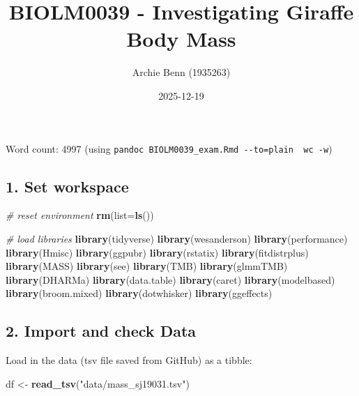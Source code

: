 \documentclass[
]{article}
\title{BIOLM0039 - Investigating Giraffe Body Mass}
\author{Archie Benn (1935263)}
\date{2025-12-19}
\newenvironment{Shaded}{\begin{snugshade}}{\end{snugshade}}
\newcommand{\AttributeTok}[1]{\textcolor[rgb]{0.13,0.29,0.53}{#1}}
\newcommand{\CommentTok}[1]{\textcolor[rgb]{0.56,0.35,0.01}{\textit{#1}}}
\newcommand{\FunctionTok}[1]{\textcolor[rgb]{0.13,0.29,0.53}{\textbf{#1}}}
\newcommand{\NormalTok}[1]{#1}
\newcommand{\OtherTok}[1]{\textcolor[rgb]{0.56,0.35,0.01}{#1}}
\newcommand{\StringTok}[1]{\textcolor[rgb]{0.31,0.60,0.02}{#1}}
\begin{document}
\maketitle

Word count: 4997 (using
\texttt{pandoc\ BIOLM0039\_exam.Rmd\ -\/-to=plain\ \textbar{}\ wc\ -w})

\subsection{1. Set workspace}\label{set-workspace}

\begin{Shaded}
\begin{Highlighting}[]
\CommentTok{\# reset environment}
\FunctionTok{rm}\NormalTok{(}\AttributeTok{list=}\FunctionTok{ls}\NormalTok{())}

\CommentTok{\# load libraries}
\FunctionTok{library}\NormalTok{(tidyverse)}
\FunctionTok{library}\NormalTok{(wesanderson)}
\FunctionTok{library}\NormalTok{(performance)}
\FunctionTok{library}\NormalTok{(Hmisc)}
\FunctionTok{library}\NormalTok{(ggpubr)}
\FunctionTok{library}\NormalTok{(rstatix)}
\FunctionTok{library}\NormalTok{(fitdistrplus)}
\FunctionTok{library}\NormalTok{(MASS)}
\FunctionTok{library}\NormalTok{(see)}
\FunctionTok{library}\NormalTok{(TMB)}
\FunctionTok{library}\NormalTok{(glmmTMB)}
\FunctionTok{library}\NormalTok{(DHARMa)}
\FunctionTok{library}\NormalTok{(data.table)}
\FunctionTok{library}\NormalTok{(caret)}
\FunctionTok{library}\NormalTok{(modelbased)}
\FunctionTok{library}\NormalTok{(broom.mixed)}
\FunctionTok{library}\NormalTok{(dotwhisker)}
\FunctionTok{library}\NormalTok{(ggeffects)}
\end{Highlighting}
\end{Shaded}

\subsection{2. Import and check Data}\label{import-and-check-data}

Load in the data (tsv file saved from GitHub) as a tibble:

\begin{Shaded}
\begin{Highlighting}[]
\NormalTok{df }\OtherTok{\textless{}{-}} \FunctionTok{read\_tsv}\NormalTok{(}\StringTok{"data/mass\_sj19031.tsv"}\NormalTok{)}
\end{Highlighting}
\end{Shaded}
\end{document}
